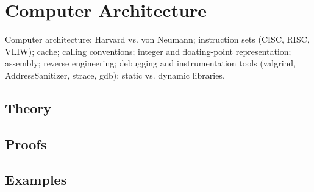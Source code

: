 
\section{Computer Architecture}
\label{sec:2.3b.05-computer-architecture}

\begin{ticket}
Computer architecture: Harvard vs. von Neumann; instruction sets (CISC, RISC, VLIW); cache; calling conventions; integer and floating-point representation; assembly; reverse engineering; debugging and instrumentation tools (valgrind, AddressSanitizer, strace, gdb); static vs. dynamic libraries.
\end{ticket}

\subsection*{Theory}

\subsection*{Proofs}

\subsection*{Examples}
